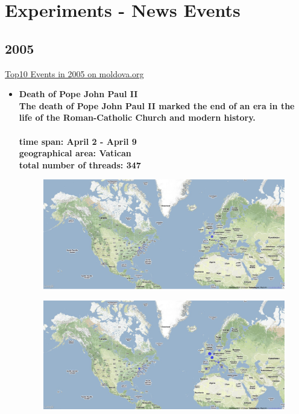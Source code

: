 \documentclass[11pt,a4paper,english]{article}
\begin{document}
 \newpage

	\section{Experiments - News Events}
			\subsection{2005}
			\href{http://politicom.moldova.org/news/10-most-important-world-events-of-2005-7712-eng.html}{Top10 Events in 2005 on moldova.org}
				\begin{itemize}
				\item \bf Death of Pope John Paul II\rm
					\\ The death of Pope John Paul II marked the end of an era in the life of the Roman-Catholic Church and modern history. 
					\\\\ \bf time span: \rm April 2 - April 9
					\\ \bf geographical area: \rm Vatican
					\\ \bf total number of threads: \rm 347

					\begin{figure}[H]
						\vspace{-10pt}	
						\begin{center}
							\includegraphics[width=130mm]{img/pre-pope}
						\end{center}
						\vspace{-13pt}
					\end{figure}
					\begin{figure}[H]
						\vspace{-10pt}
  						\begin{center}
							\includegraphics[width=130mm]{img/post-pope}
						\end{center}
						\vspace{-13pt}
					\end{figure}
						

\end{itemize}
\end{document}
